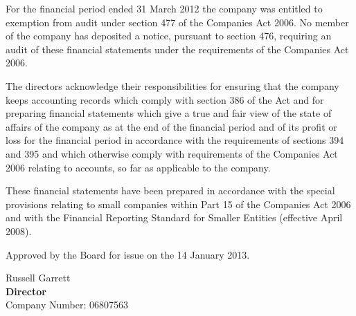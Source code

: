 {\footnotesize For the financial period ended 31 March 2012 the
company was entitled to exemption from audit under section 477 of the
Companies Act 2006. No member of the company has deposited a
notice, pursuant to section 476, requiring an audit of these
financial statements under the requirements of the Companies Act
2006.

The directors acknowledge their responsibilities for ensuring that
the company keeps accounting records which comply with section 386
of the Act and for preparing financial statements which give a true
and fair view of the state of affairs of the company as at the end
of the financial period and of its profit or loss for the financial
period in accordance with the requirements of sections 394 and 395
and which otherwise comply with requirements of the Companies Act
2006 relating to accounts, so far as applicable to the company.

These financial statements have been prepared in accordance with
the special provisions relating to small companies within Part 15
of the Companies Act 2006 and with the Financial Reporting Standard
for Smaller Entities (effective April 2008).}

\vfill

Approved by the Board for issue on the 14 January 2013.
\vspace{48pt}

Russell Garrett \\
{\bf Director} \\
Company Number: 06807563
